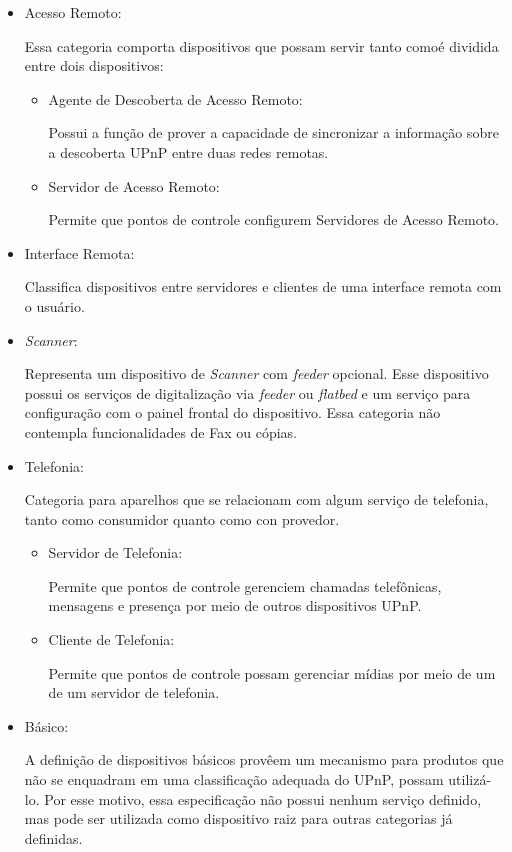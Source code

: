 \begin{itemize}
\item Acesso Remoto:

	Essa categoria comporta dispositivos que possam servir tanto comoé dividida entre dois dispositivos:
	\begin{itemize}
		\item Agente de Descoberta de Acesso Remoto:

			Possui a função de prover a capacidade de sincronizar a informação sobre a descoberta UPnP entre duas redes remotas.
		
		\item Servidor de Acesso Remoto:
		
			Permite que pontos de controle configurem Servidores de Acesso Remoto.

	\end{itemize}

\item Interface Remota:

	Classifica dispositivos entre servidores e clientes de uma interface remota com o usuário.

\item \emph{Scanner}:

	Representa um dispositivo de \emph{Scanner} com \emph{feeder} opcional. Esse dispositivo possui os serviços de digitalização via \emph{feeder} ou \emph{flatbed} e um serviço para configuração com o painel frontal do dispositivo. Essa categoria não contempla funcionalidades de Fax ou cópias.

\item Telefonia:
	
	Categoria para aparelhos que se relacionam com algum serviço de telefonia, tanto como consumidor quanto como con provedor.
	\begin{itemize}
		\item Servidor de Telefonia:

			Permite que pontos de controle gerenciem chamadas telefônicas, mensagens e presença por meio de outros dispositivos UPnP. 

		\item Cliente de Telefonia:
		
			Permite que pontos de controle possam gerenciar mídias por meio de um de um servidor de telefonia.
				
	\end{itemize}

\item Básico:

	A definição de dispositivos básicos provêem um mecanismo para produtos que não se enquadram em uma classificação adequada do UPnP, possam utilizá-lo. Por esse motivo, essa especificação não possui nenhum serviço definido, mas pode ser utilizada como dispositivo raiz para outras categorias já definidas.
\end{itemize}

